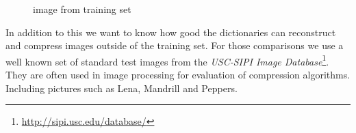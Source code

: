 \begin{figure}[h]
\hspace{5mm}
\caption{image from training set}
\label{fig:USC-SIPI}
\end{figure}
In addition to this we want to know how good the dictionaries can reconstruct
and compress images outside of the training set. For those comparisons we use a
well known set of standard test images from the \emph{USC-SIPI Image
Database}\footnote{\url{http://sipi.usc.edu/database/}}. They are often
used in image processing for evaluation of compression algorithms. 
Including pictures such as Lena, Mandrill and Peppers.
